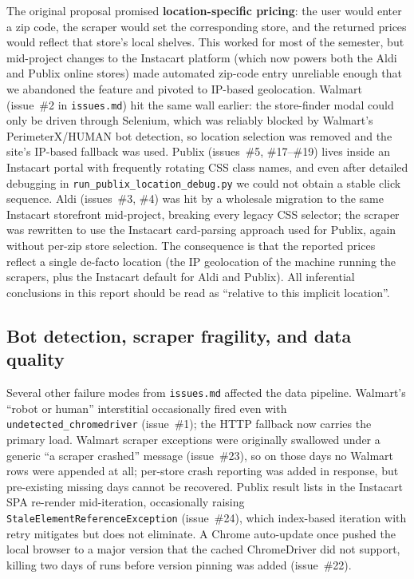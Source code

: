\documentclass[11pt]{article}
\begin{document}
The original proposal promised \textbf{location-specific pricing}: the
user would enter a zip code, the scraper would set the corresponding
store, and the returned prices would reflect that store's local
shelves. This worked for most of the semester, but mid-project changes
to the Instacart platform (which now powers both the Aldi and Publix
online stores) made automated zip-code entry unreliable enough that
we abandoned the feature and pivoted to IP-based geolocation. Walmart
(issue~\#2 in \texttt{issues.md}) hit the same wall earlier: the
store-finder modal could only be driven through Selenium, which was
reliably blocked by Walmart's PerimeterX/HUMAN bot detection, so
location selection was removed and the site's IP-based fallback was
used. Publix (issues~\#5, \#17--\#19) lives inside an Instacart portal
with frequently rotating CSS class names, and even after detailed
debugging in
\texttt{run\_publix\_\allowbreak location\_\allowbreak debug.py}
we could not obtain a stable click sequence. Aldi (issues~\#3, \#4)
was hit by a wholesale migration to the same Instacart storefront
mid-project, breaking every legacy CSS selector; the scraper was
rewritten to use the Instacart card-parsing approach used for Publix,
again without per-zip store selection. The consequence is that the
reported prices reflect a single de-facto location (the IP geolocation
of the machine running the scrapers, plus the Instacart default for
Aldi and Publix). All inferential conclusions in this report should be
read as ``relative to this implicit location''.

\subsection{Bot detection, scraper fragility, and data quality}

Several other failure modes from \texttt{issues.md} affected the data
pipeline. Walmart's ``robot or human'' interstitial occasionally fired
even with \texttt{undetected\_\allowbreak chromedriver} (issue~\#1);
the HTTP fallback now carries the primary load. Walmart scraper
exceptions were originally swallowed under a generic ``a scraper
crashed'' message (issue~\#23), so on those days no Walmart rows were
appended at all; per-store crash reporting was added in response, but
pre-existing missing days cannot be recovered. Publix result lists in
the Instacart SPA re-render mid-iteration, occasionally raising
\texttt{StaleElementReferenceException} (issue~\#24), which
index-based iteration with retry mitigates but does not eliminate.
A Chrome auto-update once pushed the local browser to a major version
that the cached ChromeDriver did not support, killing two days of
runs before version pinning was added (issue~\#22).
\end{document}
